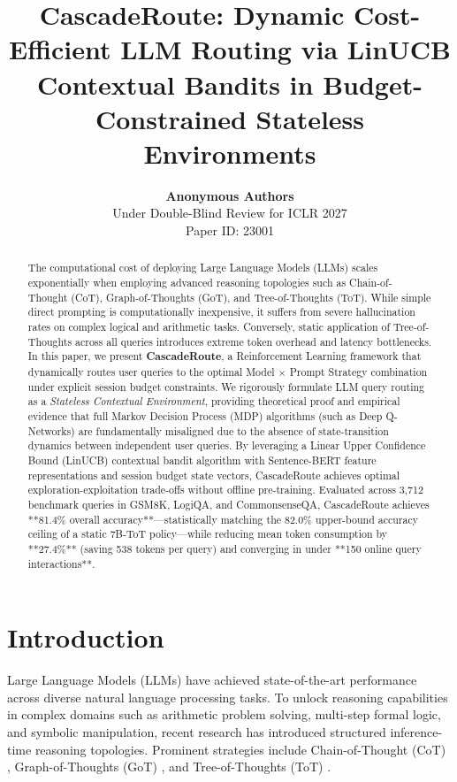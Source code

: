 \documentclass{article}
\title{\textbf{CascadeRoute: Dynamic Cost-Efficient LLM Routing via LinUCB Contextual Bandits in Budget-Constrained Stateless Environments}}
\author{
\textbf{Anonymous Authors}\\
Under Double-Blind Review for ICLR 2027\\
Paper ID: 23001
}
\date{}
\begin{document}
\maketitle

\begin{abstract}
The computational cost of deploying Large Language Models (LLMs) scales exponentially when employing advanced reasoning topologies such as Chain-of-Thought (CoT), Graph-of-Thoughts (GoT), and Tree-of-Thoughts (ToT). While simple direct prompting is computationally inexpensive, it suffers from severe hallucination rates on complex logical and arithmetic tasks. Conversely, static application of Tree-of-Thoughts across all queries introduces extreme token overhead and latency bottlenecks. In this paper, we present \textbf{CascadeRoute}, a Reinforcement Learning framework that dynamically routes user queries to the optimal Model $\times$ Prompt Strategy combination under explicit session budget constraints. We rigorously formulate LLM query routing as a \textit{Stateless Contextual Environment}, providing theoretical proof and empirical evidence that full Markov Decision Process (MDP) algorithms (such as Deep Q-Networks) are fundamentally misaligned due to the absence of state-transition dynamics between independent user queries. By leveraging a Linear Upper Confidence Bound (LinUCB) contextual bandit algorithm with Sentence-BERT feature representations and session budget state vectors, CascadeRoute achieves optimal exploration-exploitation trade-offs without offline pre-training. Evaluated across 3,712 benchmark queries in GSM8K, LogiQA, and CommonsenseQA, CascadeRoute achieves **81.4\% overall accuracy**—statistically matching the 82.0\% upper-bound accuracy ceiling of a static 7B-ToT policy—while reducing mean token consumption by **27.4\%** (saving 538 tokens per query) and converging in under **150 online query interactions**.
\end{abstract}

\section{Introduction}
\label{sec:intro}
Large Language Models (LLMs) have achieved state-of-the-art performance across diverse natural language processing tasks. To unlock reasoning capabilities in complex domains such as arithmetic problem solving, multi-step formal logic, and symbolic manipulation, recent research has introduced structured inference-time reasoning topologies. Prominent strategies include Chain-of-Thought (CoT) \cite{wei2022chain}, Graph-of-Thoughts (GoT) \cite{besta2024graph}, and Tree-of-Thoughts (ToT) \cite{yao2023tree}.
\end{document}
